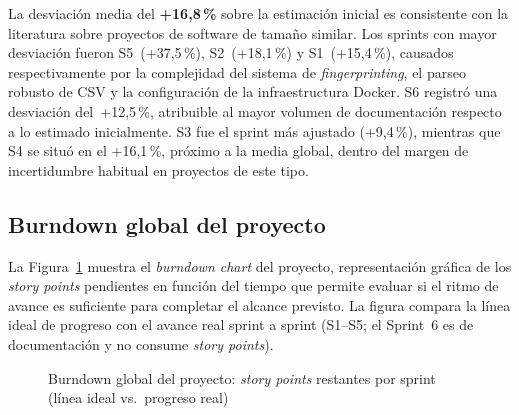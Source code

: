 La desviación media del \textbf{+16,8\,\%} sobre la estimación inicial es
consistente con la literatura sobre proyectos de software de tamaño similar.
Los sprints con mayor desviación fueron S5~(+37,5\,\%), S2~(+18,1\,\%) y
S1~(+15,4\,\%), causados respectivamente por la complejidad del sistema de
\emph{fingerprinting}, el parseo robusto de \ac{CSV} y la configuración de la
infraestructura Docker.  S6 registró una desviación del~+12,5\,\%, atribuible
al mayor volumen de documentación respecto a lo estimado inicialmente.  S3 fue
el sprint más ajustado (+9,4\,\%), mientras que S4 se situó en el
+16,1\,\%, próximo a la media global, dentro del margen de
incertidumbre habitual en proyectos de este tipo.


\subsection{Burndown global del proyecto}
\label{sec:burndown-global}

La Figura~\ref{fig:burndown-global} muestra el \emph{burndown chart} del
proyecto, representación gráfica de los \emph{story points} pendientes en
función del tiempo que permite evaluar si el ritmo de avance es suficiente
para completar el alcance previsto.  La figura compara la línea ideal de
progreso con el avance real sprint a sprint (S1--S5; el Sprint~6 es de
documentación y no consume \emph{story points}).

\begin{figure}[htbp]
  \centering
  \caption{Burndown global del proyecto: \emph{story points} restantes por
    sprint (línea ideal vs.\ progreso real)}
  \label{fig:burndown-global}
\end{figure}

